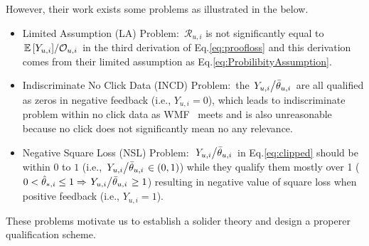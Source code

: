\documentclass[sigconf]{acmart}
\begin{document}
However, their work exists some problems as illustrated in the below. 
\begin{itemize}
	\item Limited Assumption (LA) Problem$\colon$ $\mathcal{R}_{u,i}$ is not significantly equal to $\left. {\mathbb{E} \left[Y_{u,i}\right]} \middle/ {\mathcal{O}_{u,i}} \right.$ in the third derivation of Eq.\eqref{eq:proofloss} and this derivation comes from their limited assumption as Eq.\eqref{eq:ProbilibityAssumption}.
	\item Indiscriminate No Click Data (INCD) Problem$\colon$ the $\left.{Y_{u,i}}\middle/{\bar{\theta}_{u,i}}\right.$ are all qualified as zeros in negative feedback (i.e., $Y_{u,i} = 0$), which leads to indiscriminate problem within no click data as WMF~\cite{hu2008collaborative} meets and is also unreasonable because no click does not significantly mean no any relevance.
	\item Negative Square Loss (NSL) Problem$\colon$ $\left.{Y_{u,i}} \middle/ {\bar{\theta}_{u,i}} \right.$ in Eq.\eqref{eq:clipped} should be within $0$ to $1$ (i.e., $\left.{Y_{u,i}} \middle/ {\bar{\theta}_{u,i}} \right. \in (0,1) $) while they qualify them mostly over 1 ($0 < \hat{\theta}_{*,i} \leq 1 \Rightarrow \left.{Y_{u,i}} \middle/ {\bar{\theta}_{u,i}} \right. \geq 1 $) resulting in negative value of square loss when positive feedback (i.e., $Y_{u,i} = 1$). 
	
\end{itemize}
These problems motivate us to establish a solider theory and design a properer qualification scheme.
\end{document}
